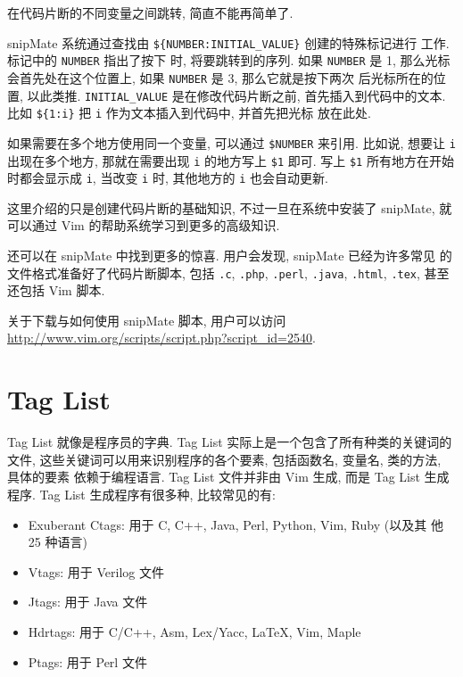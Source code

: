 在代码片断的不同变量之间跳转, 简直不能再简单了.

snipMate 系统通过查找由 \texttt{\$\{NUMBER:INITIAL\_VALUE\}} 创建的特殊标记进行
工作. 标记中的 \texttt{NUMBER} 指出了按下  时, 将要跳转到的序列.
如果 \texttt{NUMBER} 是 1, 那么光标会首先处在这个位置上, 如果 \texttt{NUMBER}
是 3, 那么它就是按下两次  后光标所在的位置, 以此类推.
\texttt{INITIAL\_VALUE} 是在修改代码片断之前, 首先插入到代码中的文本.
比如 \texttt{\$\{1:i\}} 把 \texttt{i} 作为文本插入到代码中, 并首先把光标
放在此处.

如果需要在多个地方使用同一个变量, 可以通过 \texttt{\$NUMBER} 来引用. 比如说,
想要让 \texttt{i} 出现在多个地方, 那就在需要出现 \texttt{i} 的地方写上
\texttt{\$1} 即可. 写上 \texttt{\$1} 所有地方在开始时都会显示成 \texttt{i},
当改变 \texttt{i} 时, 其他地方的 \texttt{i} 也会自动更新.

这里介绍的只是创建代码片断的基础知识, 不过一旦在系统中安装了 snipMate,
就可以通过 Vim 的帮助系统学习到更多的高级知识.

还可以在 snipMate 中找到更多的惊喜. 用户会发现, snipMate 已经为许多常见
的文件格式准备好了代码片断脚本, 包括 \texttt{.c}, \texttt{.php},
\texttt{.perl}, \texttt{.java}, \texttt{.html}, \texttt{.tex}, 甚至还包括 Vim
脚本.

\begin{warning}
    关于下载与如何使用 snipMate 脚本, 用户可以访问
    \url{http://www.vim.org/scripts/script.php?script_id=2540}.
\end{warning}

\section{Tag List}
\label{sec:using_tag_list}

Tag List 就像是程序员的字典. Tag List 实际上是一个包含了所有种类的关键词的文件,
这些关键词可以用来识别程序的各个要素, 包括函数名, 变量名, 类的方法, 具体的要素
依赖于编程语言. Tag List 文件并非由 Vim 生成, 而是 Tag List 生成程序. Tag List
生成程序有很多种, 比较常见的有:
\begin{itemize}
    \item Exuberant Ctags: 用于 C, C++, Java, Perl, Python, Vim, Ruby (以及其
        他 25 种语言)
    \item Vtags: 用于 Verilog 文件
    \item Jtags: 用于 Java 文件
    \item Hdrtags: 用于 C/C++, Asm, Lex/Yacc, LaTeX, Vim, Maple
    \item Ptags: 用于 Perl 文件
\end{itemize}

